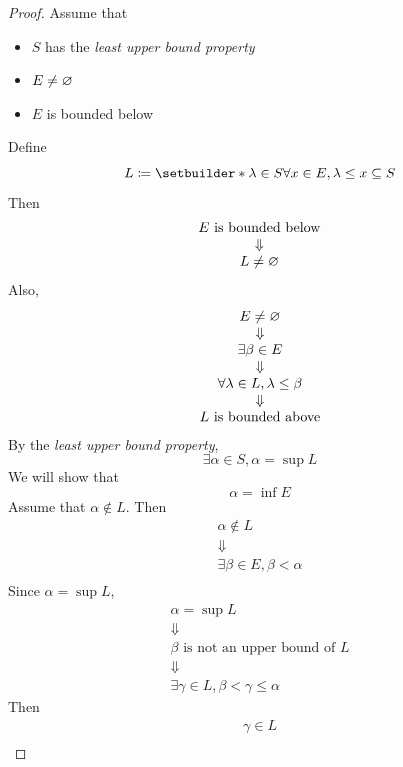 \begin{proof}
    Assume that
    \begin{itemize}
        \item $S$ has the \emph{least upper bound property}
        \item $E \neq \varnothing$
        \item $E$ is bounded below
    \end{itemize}
    Define
    \[
    L \coloneqq \setbuilder*{\lambda \in S}{\forall x \in E, \lambda \leq x} \subseteq S
    \]
    Then
    \[
    \begin{array}{c}
        E \text{ is bounded below} \\
        \Downarrow \\
        L \neq \varnothing
    \end{array}
    \]
    Also,
    \[
    \begin{array}{c}
        E \neq \varnothing \\
        \Downarrow \\
        \exists \beta \in E \\
        \Downarrow \\
        \forall \lambda \in L, \lambda \leq \beta \\
        \Downarrow \\
        L \text{ is bounded above}
    \end{array}
    \]
    By the \emph{least upper bound property},
    \[
    \exists \alpha \in S, \alpha = \sup L
    \]
    We will show that
    \[
    \alpha = \inf E
    \]
    Assume that $\alpha \notin L$. Then
    \[
    \begin{array}{c}
        \alpha \notin L \\
        \Downarrow \\
        \exists \beta \in E, \beta < \alpha \\
    \end{array}
    \]
    Since $\alpha = \sup L$,
    \[
    \begin{array}{c}
        \alpha = \sup L \\
        \Downarrow \\
        \beta \text{ is not an upper bound of } L \\
        \Downarrow \\
        \exists \gamma \in L, \beta < \gamma \leq \alpha
    \end{array}
    \]
    Then
    \[
    \begin{array}{c}
        \gamma \in L \\

\end{array}\]
\end{proof}
